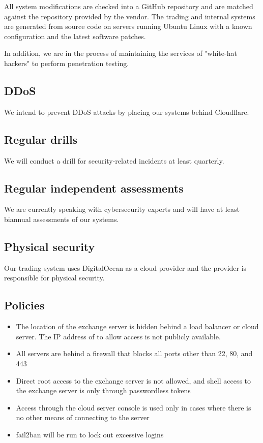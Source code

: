 All system modifications are checked into a GitHub repository and are
matched against the repository provided by the vendor.  The trading
and internal systems are generated from source code on servers running
Ubuntu Linux with a known configuration and the latest software patches.

In addition, we are in the process of maintaining the services of
"white-hat hackers" to perform penetration testing.

\subsection{DDoS}
We intend to prevent DDoS attacks by placing our systems behind
Cloudflare.

\subsection{Regular drills}
We will conduct a drill for security-related incidents at least quarterly.


\subsection{Regular independent assessments}
We are currently speaking with cybersecurity experts and will have at
least biannual assessments of our systems.


\subsection{Physical security}
Our trading system uses DigitalOcean as a cloud provider and the
provider is responsible for physical security.


\subsection{Policies}
\begin{itemize}
  \item The location of the exchange server is hidden behind a load
  balancer or cloud server.  The IP address of to allow access is not
  publicly available.
  \item All servers are behind a firewall that blocks all ports other
    than 22, 80, and 443
  \item Direct root access to the exchange server is not allowed, and
    shell access to the exchange server is only through passwordless
    tokens
  \item Access through the cloud server console is used only in
    cases where there is no other means of connecting to the server
  \item fail2ban will be run to lock out excessive logins 
\end{itemize}

